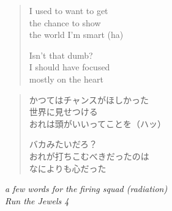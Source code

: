 \clearpage\thispagestyle{empty}\vspace*{\fill}

\begin{verse}
I used to want to get \\
the chance to show \\
the world I'm smart (ha)

Isn't that dumb? \\
I should have focused \\
mostly on the heart
\end{verse}
\begin{verse}\small
かつてはチャンスがほしかった \\
世界に見せつける \\
おれは頭がいいってことを（ハッ）

バカみたいだろ？ \\
おれが打ちこむべきだったのは \\
なによりも心だった
\end{verse}
\begin{flushright}\small\itshape
a few words for the firing squad (radiation) \\
Run the Jewels 4
\end{flushright}

\vspace*{\fill}\clearpage
